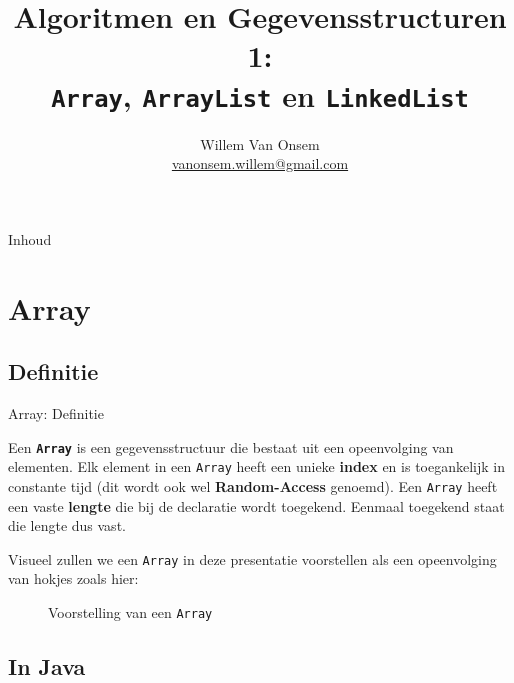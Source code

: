\documentclass[handout]{beamer}
\title{Algoritmen en Gegevensstructuren 1:\\ \texttt{Array}, \texttt{ArrayList} en \texttt{LinkedList}}
\author{Willem Van Onsem\\ \href{mailto:vanonsem.willem@gmail.com?Subject=Presentatie\%20Algoritmen\%20en\%20Gegevensstructuren\%201}{vanonsem.willem@gmail.com}}
\theoremstyle{remark}
\newcommand{\term}[1]{\textbf{#1}}
\newcommand{\dsarray}{\texttt{Array}}
\begin{document}
\begin{frame}
\maketitle
\end{frame}
\begin{frame}[plain]{Inhoud}
\begin{multicols}{2}
\tableofcontents
\end{multicols}
\end{frame}
\section{Array}
\subsection{Definitie}
\begin{frame}{Array: Definitie}
\begin{definition}[Array]
Een \term{\dsarray{}} is een gegevensstructuur die bestaat uit een opeenvolging van elementen. Elk element in een \dsarray{} heeft een unieke \term{index} en is toegankelijk in constante tijd (dit wordt ook wel \term{Random-Access} genoemd). Een \dsarray{} heeft een vaste \term{lengte} die bij de declaratie wordt toegekend. Eenmaal toegekend staat die lengte dus vast.
\end{definition}
Visueel zullen we een \dsarray{} in deze presentatie voorstellen als een opeenvolging van hokjes zoals hier:
\begin{figure}
\caption{Voorstelling van een \dsarray{}}
\end{figure}
\end{frame}
\subsection{In Java}
\end{document}
